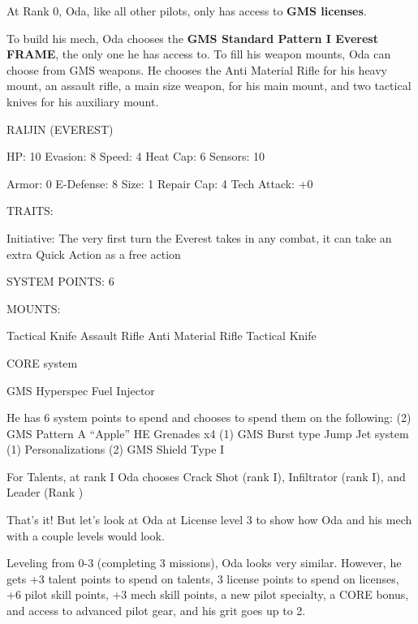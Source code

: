 At Rank 0, Oda, like all other pilots, only has access to \textbf{GMS licenses}.

To build his mech, Oda chooses the \textbf{GMS Standard Pattern I Everest FRAME}, the only one he has access to. To fill his weapon mounts, Oda can choose from GMS weapons. He chooses the Anti Material Rifle for his heavy mount, an assault rifle, a main size weapon, for his main mount, and two tactical knives for his auxiliary mount.

                                             RAIJIN (EVEREST)

  HP: 10          Evasion: 8                             Speed: 4            Heat Cap: 6        Sensors: 10

  Armor: 0        E-Defense: 8                           Size: 1             Repair Cap: 4      Tech Attack:
                                                                                                +0

                                                     TRAITS:

  Initiative: The very first turn the Everest takes in any combat, it can take an extra Quick Action as a free
  action

                                               SYSTEM POINTS: 6

                                                    MOUNTS:

  Tactical Knife
                    Assault Rifle                           Anti Material Rifle
  Tactical Knife

                                                  CORE system

                                         GMS Hyperspec Fuel Injector

He has 6 system points to spend and chooses to spend them on the following:
(2) GMS Pattern A “Apple” HE Grenades x4
(1) GMS Burst type Jump Jet system
(1) Personalizations
(2) GMS Shield Type I


For Talents, at rank I Oda chooses Crack Shot (rank I), Infiltrator (rank I), and Leader (Rank )

That’s it! But let’s look at Oda at License level 3 to show how Oda and his mech with a couple levels would look. 

Leveling from 0-3 (completing 3 missions), Oda looks very similar. However, he gets +3 talent points to spend on talents, 3 license points to spend on licenses, +6 pilot skill points, +3 mech skill points, a new pilot specialty, a CORE bonus, and access to advanced pilot gear, and his grit goes up to 2. 

